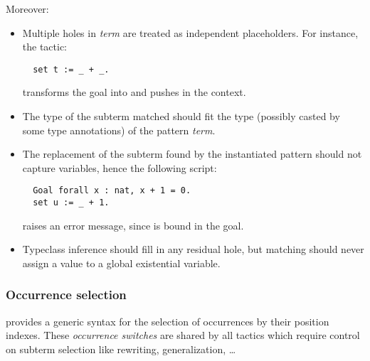 Moreover:
\begin{itemize}
\item Multiple holes in \textit{term} are treated as independent
  placeholders. For instance, the tactic:
\begin{lstlisting}
  set t := _ + _.
\end{lstlisting}
transforms the goal  into  and pushes
 in the context.
\item The type of the subterm matched should fit the type
  (possibly casted by some type annotations) of the pattern
  \textit{term}.
\item The replacement of the subterm found by the instantiated pattern
  should not capture variables, hence the following script:
\begin{lstlisting}
  Goal forall x : nat, x + 1 = 0.
  set u := _ + 1.
\end{lstlisting}
raises an error message, since  is bound in the goal.
\item Typeclass inference should fill in any residual hole, but
matching should never assign a value to a global existential variable.

\end{itemize}


\subsubsection*{Occurrence selection}\label{sssec:occselect}

\ssr{} provides a generic syntax for the selection of occurrences by
their position indexes. These \emph{occurrence switches} are shared by
all
\ssr{} tactics which require control on subterm selection like rewriting,
generalization, \dots

